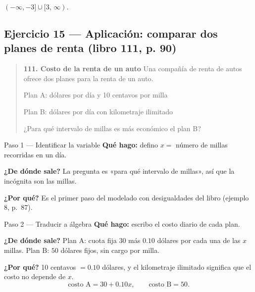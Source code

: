 \documentclass[11pt]{article}
\begin{document}
\begin{center}
\end{center}

\begin{resp}
$(-\infty,-3]\cup[3,\,\infty)$.
\end{resp}

\subsection*{Ejercicio 15 --- Aplicación: comparar dos planes de renta (libro 111, p. 90)}

\begin{quote}
\textbf{111. Costo de la renta de un auto} \; Una compañía de renta de autos ofrece dos planes para la renta de un auto.

Plan A: dólares por día y 10 centavos por milla

Plan B: dólares por día con kilometraje ilimitado

¿Para qué intervalo de millas es más económico el plan B?
\end{quote}

\begin{paso}{Paso 1 --- Identificar la variable}
\textbf{Qué hago:} defino $x=$ número de millas recorridas en un día.

\textbf{¿De dónde sale?} La pregunta es «para qué intervalo de millas», así que la incógnita son las millas.

\textbf{¿Por qué?} Es el primer paso del modelado con desigualdades del libro (ejemplo 8, p.~87).
\end{paso}

\begin{paso}{Paso 2 --- Traducir a álgebra}
\textbf{Qué hago:} escribo el costo diario de cada plan.

\textbf{¿De dónde sale?} Plan A: cuota fija $30$ más $0.10$ dólares por cada una de las $x$ millas. Plan B: $50$ dólares fijos, sin cargo por milla.

\textbf{¿Por qué?} 10 centavos $=0.10$ dólares, y el kilometraje ilimitado significa que el costo no depende de $x$.
\[
\text{costo A}=30+0.10x, \qquad \text{costo B}=50.
\]
\end{paso}
\end{document}
